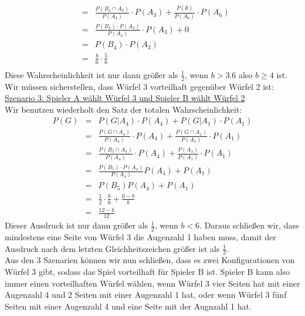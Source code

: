 \begin{Answer}
\begin{eqnarray*}
				&=&\frac{P(B_4\cap A_3)}{P(A_3)}\cdot P(A_3)+\frac{P(\emptyset)}{P(A_6)}\cdot P(A_6)\\
				&=&\frac{P(B_4)\cdot P(A_3)}{P(A_3)}\cdot P(A_3)+0\\
				&=& P(B_4)\cdot P(A_3)\\
				&=&\frac{b}{6}\cdot \frac{5}{6}\\
			\end{eqnarray*}
		Diese Wahrscheinlichkeit ist nur dann größer als $\frac{1}{2}$, wenn $b>3.6$ also $b\geq 4$ ist.\\
		Wir müssen sicherstellen, dass Würfel 3 vorteilhaft gegenüber Würfel 2 ist:\\
		\underline{Szenario 3: Spieler A wählt Würfel 3 und Spieler B wählt Würfel 2}\\
		Wir benutzen wiederholt den Satz der totalen Wahrscheinlichkeit:
		\begin{eqnarray*}
			P(G)&=&P(G\vert A_4)\cdot P(A_4)+P(G\vert A_1)\cdot P(A_1)\\
			&=&\frac{P(G\cap A_4)}{P(A_4)}\cdot P(A_4)+\frac{P(G\cap A_1)}{P(A_1)}\cdot P(A_1)\\
			&=&\frac{P(B_5\cap A_4)}{P(A_4)}\cdot P(A_4)+\frac{P(A_1)}{P(A_1)}\cdot P(A_1)\\
			&=&\frac{P(B_5)\cdot P(A_4)}{P(A_4)}P(A_4)+P(A_1)\\
			&=&P(B_5)P(A_4)+P(A_1)\\
			&=&\frac{1}{2}\cdot \frac{b}{6}+ \frac{6-b}{b}\\
			&=&\frac{12-b}{12}
		\end{eqnarray*}
		Dieser Ausdruck ist nur dann größer als $\frac{1}{2}$, wenn $b<6$.
		Daraus schließen wir, dass mindestens eine Seite von Würfel 3 die Augenzahl 1 haben muss, damit der Ausdruck nach dem letzten Gleichheitszeichen größer ist als $\frac{1}{2}$.\\
		\medspace
		Aus den 3 Szenarien können wir nun schließen, dass es zwei Konfigurationen von Würfel 3 gibt, sodass das Spiel vorteilhaft für Spieler B ist. Spieler B kann also immer einen vorteilhaften Würfel wählen, wenn Würfel 3 vier Seiten hat mit einer Augenzahl 4 und 2 Seiten mit einer Augenzahl 1 hat, oder wenn Würfel 3 fünf Seiten mit einer Augenzahl 4 und eine Seite mit der Augnzahl 1 hat.
\end{Answer}


